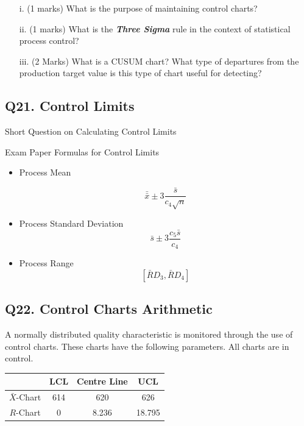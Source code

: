 \documentclass[a4paper,12pt]{article}
\begin{document}
\begin{itemize}
	\item[i.] (1 marks) What is the purpose of maintaining control charts?
	\item[ii.] (1 marks) What is the \emph{\textbf{Three Sigma}} rule in the context of statistical process control?
	\item[iii.] (2 Marks) What is a CUSUM chart? What type of departures from the production target value
	is this type of chart useful for detecting?
\end{itemize}


\newpage
\subsection*{Q21. Control Limits }
Short Question on Calculating Control Limits
\begin{framed}
	Exam Paper Formulas for Control Limits
	\begin{itemize}
		\item Process Mean
		
		
		
		\[ \bar{\bar{x}} \pm 3\frac{\bar{s}}{c_4\sqrt{n}}\]
		\item Process Standard Deviation	
		\[ \bar{s} \pm 3\frac{c_5\bar{s}}{c_4}\]
		\item Process Range	
		\[\left[ \bar{R}D_3, \bar{R}D_4\right]\]
	\end{itemize}	
\end{framed}
\newpage

\subsection*{Q22. Control Charts Arithmetic}
A normally distributed quality characteristic is monitored through the use of control charts. These charts have the following parameters. All charts are in control.
\begin{center}
	\begin{tabular}{|c|c|c|c|}
		\hline  & LCL & Centre Line & UCL \\
		\hline $\bar{X}$-Chart & 614 & 620 & 626 \\
		\hline $R$-Chart & 0 & 8.236 & 18.795 \\ \hline
	\end{tabular}
\end{center}
\end{document}
